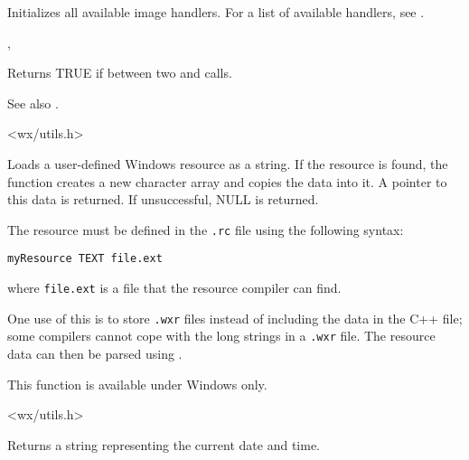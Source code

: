 
Initializes all available image handlers. For a list of available handlers,
see .


, 

\label{wxisbusy}


Returns TRUE if between two  and\rtfsp
{} calls.

See also .


<wx/utils.h>

\label{wxloaduserresource}


Loads a user-defined Windows resource as a string. If the resource is found, the function creates
a new character array and copies the data into it. A pointer to this data is returned. If unsuccessful, NULL is returned.

The resource must be defined in the {\tt .rc} file using the following syntax:

\begin{verbatim}
myResource TEXT file.ext
\end{verbatim}

where {\tt file.ext} is a file that the resource compiler can find.

One use of this is to store {\tt .wxr} files instead of including the data in the C++ file; some compilers
cannot cope with the long strings in a {\tt .wxr} file. The resource data can then be parsed
using .

This function is available under Windows only.


<wx/utils.h>

\label{wxnow}


Returns a string representing the current date and time.


